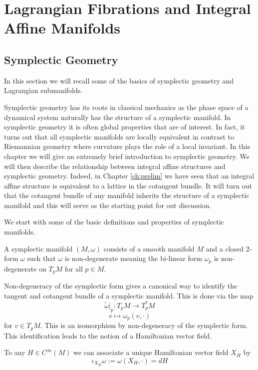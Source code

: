 \chapter{Lagrangian Fibrations and Integral Affine Manifolds}\label{LagrangianFibrations}
\section{Symplectic Geometry}

In this section we will recall some of the basics of symplectic geometry and
Lagrangian submanifolds.

Symplectic geometry has its roots in classical mechanics as the phase space of
a dynamical system naturally has the structure of a symplectic manifold. In
symplectic geometry it is often global properties that are of interest. In
fact, it turns out that all symplectic manifolds are locally equivalent in
contrast to Riemannian geometry where curvature plays the role of a local
invariant. In this chapter we will give an extremely brief introduction to
symplectic geometry. We will then describe the relationship between integral
affine structures and symplectic geometry. Indeed, in Chapter \ref{ch:prelim}
we have seen that an integral affine structure is equivalent to a lattice in
the cotangent bundle. It will turn out that the cotangent bundle of any
manifold inherits the structure of a symplectic manifold and this will serve as
the starting point for out discussion.

We start with some of the basic definitions and properties of symplectic
manifolds.

\begin{definition}
    A symplectic manifold $(M, \omega)$ consists of a smooth manifold $M$ and a closed 2-form $\omega$ such that $\omega$ is non-degenerate meaning the bi-linear form $\omega_p$ is non-degenerate on $T_pM$ for all $p \in M$.
\end{definition}

Non-degeneracy of the symplectic form gives a canonical way to identify the
tangent and cotangent bundle of a symplectic manifold. This is done via the map
$$ \tilde{\omega}|_p : T_pM \to T_p^*M $$ $$ v \mapsto \omega_p(v, \cdot)$$ for
$v \in T_pM$. This is an isomorphism by non-degeneracy of the symplectic form.
This identification leads to the notion of a Hamiltonian vector field.

\begin{definition}
    To any $H\in C^{\infty}(M)$ we can associate a unique Hamiltonian vector field $X_H$ by
    $$\iota_{X_H}\omega := \omega(X_H, \cdot) = dH$$
\end{definition}


